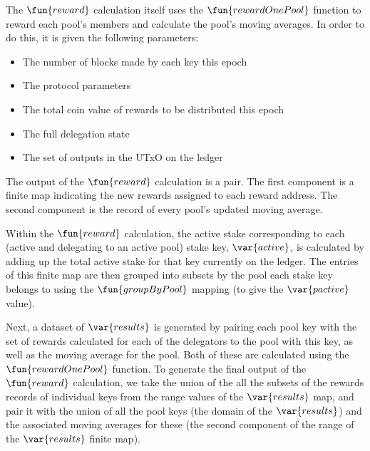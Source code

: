 The $\fun{reward}$ calculation itself uses the $\fun{rewardOnePool}$ function to
reward each pool's members and calculate the pool's moving averages. In order to
do this, it is given the following parameters:

\begin{itemize}
\item The number of blocks made by each key this epoch
\item The protocol parameters
\item The total coin value of rewards to be distributed this epoch
\item The full delegation state
\item The set of outputs in the UTxO on the ledger
\end{itemize}

The output of the $\fun{reward}$ calculation is a pair. The first component is
a finite map indicating the new rewards assigned to each reward address.
The second component is the record of every pool's updated moving average.

Within the $\fun{reward}$ calculation, the active stake corresponding to each
(active and delegating to an active pool) stake key, $\var{active}$, is
calculated by adding up the total active stake for that key currently on the
ledger. The entries of this finite map are then grouped into subsets by the pool
each stake key belongs to using the $\fun{groupByPool}$ mapping (to give the
$\var{pactive}$ value).

Next, a dataset of $\var{results}$ is generated by pairing each pool key with
the set of rewards calculated for each of the delegators to the pool with this
key, as well as the moving average for the pool. Both of these are calculated
using the $\fun{rewardOnePool}$ function.  To generate the final output of the
$\fun{reward}$ calculation, we take the union of the all the subsets of the
rewards records of individual keys from the range values of the $\var{results}$
map, and pair it with the union of all the pool keys (the domain of the
$\var{results}$) and the associated moving averages for these (the second
component of the range of the $\var{results}$ finite map).

